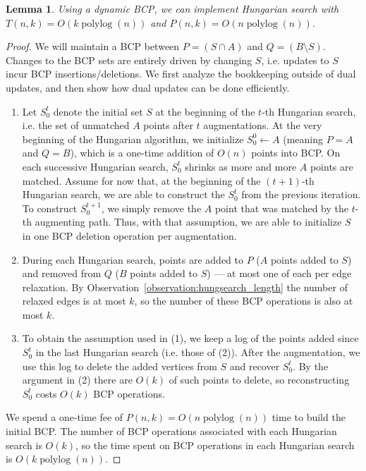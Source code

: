 \documentclass[11pt]{article}
\def\polylog{\mathop{\mathrm{polylog}}}
\theoremstyle{plain}
\newtheorem{lemma}{Lemma}
\begin{document}
\begin{lemma}
	Using a dynamic BCP, we can implement Hungarian search with 
	$T(n, k) = O(k\polylog(n))$ and $P(n, k) = O(n\polylog(n))$.
\end{lemma}
\begin{proof}
	We will maintain a BCP between $P = (S \cap A)$ and 
	$Q = (B \setminus S)$.
	Changes to the BCP sets are entirely driven by changing $S$,
	i.e. updates to $S$ incur BCP insertions/deletions.
	We first analyze the bookkeeping outside of dual updates, and then
	show how dual updates can be done efficiently.

	\begin{enumerate}
	\item Let $S^t_0$ denote the initial set $S$ at the beginning of the 
		$t$-th Hungarian search, i.e. the set of unmatched $A$ points
		after $t$ augmentations.
		At the very beginning of the Hungarian algorithm, we initialize 
		$S^0_0 \gets A$ (meaning $P = A$ and $Q = B$), which is a 
		one-time addition of $O(n)$ points into BCP.
		On each successive Hungarian search, $S^t_0$ shrinks as more 
		and more $A$ points are matched.
		Assume for now that, at the beginning of the $(t+1)$-th 
		Hungarian search, we are able to construct the $S^t_0$ from the 
		previous iteration.
		To construct $S^{t+1}_0$, we simply remove the $A$ point that 
		was matched by the $t$-th augmenting path.
		Thus, with that assumption, we are able to initialize $S$ in 
		one BCP deletion operation per augmentation.

	\item During each Hungarian search, points are added to $P$ ($A$ points 
		added to $S$) and removed from $Q$ ($B$ points added to $S$)
		--- at most one of each per edge relaxation.
		By Observation~\ref{observation:hungsearch_length} the number 
		of relaxed edges is at most $k$, so the number of these BCP 
		operations is also at most $k$.

	\item To obtain the assumption used in (1), we keep a log of the 
		points added since $S^t_0$ in the last Hungarian search 
		(i.e. those of (2)).
		After the augmentation, we use this log to delete the added 
		vertices from $S$ and recover $S^t_0$.
		By the argument in (2) there are $O(k)$ of such points to 
		delete, so reconstructing $S^t_0$ costs $O(k)$ BCP operations.
	\end{enumerate}
	We spend a one-time fee of $P(n, k) = O(n \polylog(n))$ time to build 
	the initial BCP.
	The number of BCP operations associated with each Hungarian search is 
	$O(k)$, so the time spent on BCP operations in each Hungarian search
	is $O(k \polylog(n))$.
	

\end{proof}
\end{document}
